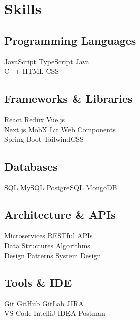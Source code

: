 \documentclass[]{deedy-resume-reversed}
\begin{document}
\begin{minipage}[t]{0.33\textwidth}


\section{Skills}
\subsection{Programming Languages}
JavaScript \textbullet{} TypeScript \textbullet{} Java \\
C++ \textbullet{} HTML \textbullet{} CSS \\

\subsection{Frameworks \& Libraries}
React \textbullet{} Redux \textbullet{} Vue.js \\
Next.js \textbullet{} MobX \textbullet{} Lit Web Components \\
Spring Boot \textbullet{} TailwindCSS \\

\subsection{Databases}
SQL \textbullet{} MySQL \textbullet{} PostgreSQL \textbullet{} MongoDB \\

\subsection{Architecture \& APIs}
Microservices \textbullet{} RESTful APIs \\
Data Structures \textbullet{} Algorithms \\
Design Patterns \textbullet{} System Design \\

\subsection{Tools \& IDE}
Git \textbullet{} GitHub \textbullet{} GitLab \textbullet{} JIRA \\
VS Code \textbullet{} IntelliJ IDEA \textbullet{} Postman \\


\end{minipage}
\end{document}
